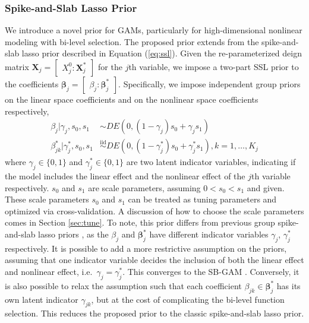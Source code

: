 \documentclass[AMA,STIX1COL,]{WileyNJD-v2}
\begin{document}
\hypertarget{spike-and-slab-lasso-prior}{%
\subsubsection{Spike-and-Slab Lasso
Prior}\label{spike-and-slab-lasso-prior}}

We introduce a novel prior for GAMs, particularly for high-dimensional
nonlinear modeling with bi-level selection. The proposed prior extends
from the spike-and-slab lasso prior described in Equation
(\ref{eq:ssl}). Given the re-parameterized deign matrix
\(\boldsymbol{X}_j = \begin{bmatrix} X^0_j : \boldsymbol{X}_j^*\end{bmatrix}\)
for the \(j\)th variable, we impose a two-part SSL prior to the
coefficients
\(\boldsymbol{\beta}_j = \begin{bmatrix} \beta_j : \boldsymbol{\beta}_j^*\end{bmatrix}\).
Specifically, we impose independent group priors on the linear space
coefficients and on the nonlinear space coefficients respectively,
\begin{align}\label{eq:bham_ssl}
  \beta_{j} |\gamma_{j},s_0,s_1 &\sim DE(0,(1-\gamma_{j}) s_0 + \gamma_{j} s_1) \nonumber \\
  \beta^*_{jk} | \gamma^*_{j},s_0,s_1 &\overset{\text{iid}}{\sim}DE(0,(1-\gamma^*_{j}) s_0 + \gamma^*_{j} s_1), k=1,\dots, K_j
\end{align} where \(\gamma_{j}\in\{0,1\}\) and
\(\gamma^*_{j}\in \{0,1\}\) are two latent indicator variables,
indicating if the model includes the linear effect and the nonlinear
effect of the \(j\)th variable respectively. \(s_0\) and \(s_1\) are
scale parameters, assuming \(0 < s_0 < s_1\) and given. These scale
parameters \(s_0\) and \(s_1\) can be treated as tuning parameters and
optimized via cross-validation. A discussion of how to choose the scale
parameters comes in Section \ref{sec:tune}. To note, this prior differs
from previous group spike-and-slab lasso priors
\citep{Tang2018, Tang2019}, as the \(\beta_j\) and
\(\boldsymbol{\beta}^*_j\) have different indicator variables
\(\gamma_j\), \(\gamma_j^*\) respectively. It is possible to add a more
restrictive assumption on the priors, assuming that one indicator
variable decides the inclusion of both the linear effect and nonlinear
effect, i.e.~\(\gamma_j = \gamma^*_j\). This converges to the SB-GAM
\citep{Bai2021}. Conversely, it is also possible to relax the assumption
such that each coefficient \(\beta_{jk} \in \boldsymbol{\beta}^*_j\) has
its own latent indicator \(\gamma_{jk}\), but at the cost of
complicating the bi-level function selection. This reduces the proposed
prior to the classic spike-and-slab lasso prior.
\end{document}
